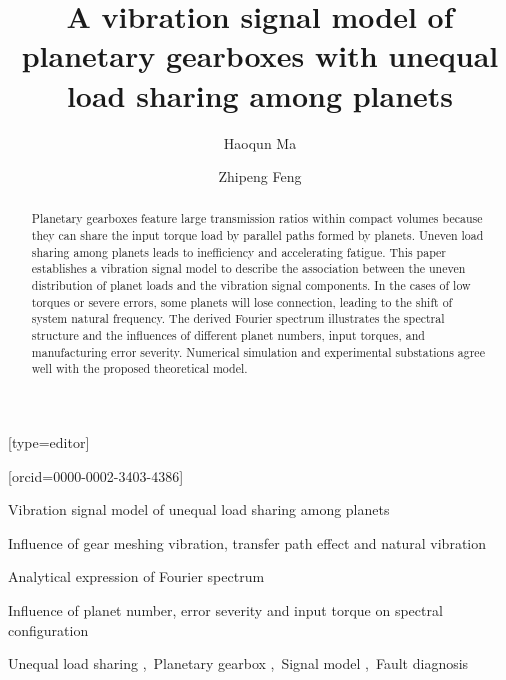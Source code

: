 \documentclass[a4paper,fleqn]{cas-sc}%
\begin{document}
\let\WriteBookmarks\relax
\def\floatpagepagefraction{1}
\def\textpagefraction{.001}
\title[mode = title]{A vibration signal model of planetary gearboxes with unequal load sharing among planets}
\author[1]{Haoqun Ma}[type=editor]
\address[1]{University of Science and Technology Beijing, No.30, Xueyuan Road, Haidian District, Beijing.}
\author[1]{Zhipeng Feng}[orcid=0000-0002-3403-4386]
\cormark[1]
%
%
% 
\begin{abstract}
    Planetary gearboxes feature large transmission ratios within compact volumes because they can share the input torque load by parallel paths formed by planets. Uneven load sharing among planets leads to inefficiency and accelerating fatigue. This paper establishes a vibration signal model to describe the association between the uneven distribution of planet loads and the vibration signal components. In the cases of low torques or severe errors, some planets will lose connection, leading to the shift of system natural frequency. The derived Fourier spectrum illustrates the spectral structure and the influences of different planet numbers, input torques, and manufacturing error severity. Numerical simulation and experimental substations agree well with the proposed theoretical model.
\end{abstract}
\begin{highlights}
    \item Vibration signal model of unequal load sharing among planets
    \item Influence of gear meshing vibration, transfer path effect and natural vibration
    \item Analytical expression of Fourier spectrum 
    \item Influence of planet number, error severity and input torque on spectral configuration
\end{highlights}
\begin{keywords}
    Unequal load sharing \sep\ Planetary gearbox \sep\ Signal model \sep\ Fault diagnosis
\end{keywords}
    
\maketitle
\def\degree{${}^{\circ}$}
\def\myscale{0.5}
\end{document}
